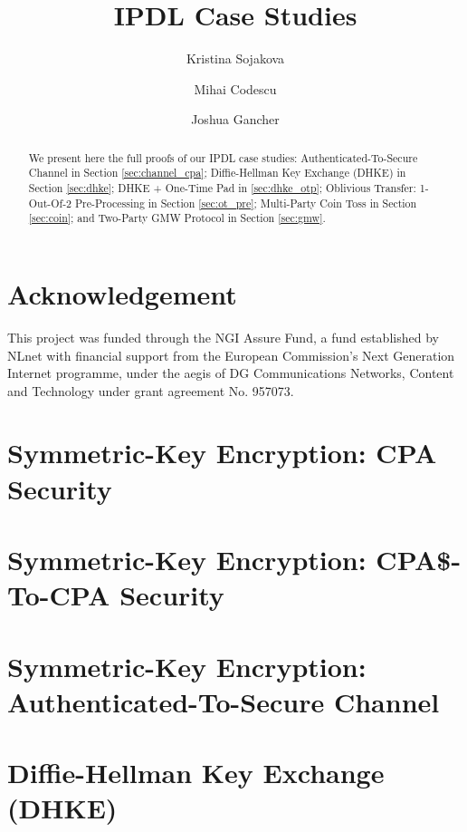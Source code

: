 \documentclass[11pt,hidelinks]{article}
\newcommand{\ipdl}{\textsf{IPDL} }
\begin{document}
\title{\ipdl Case Studies}
\author{Kristina Sojakova \and Mihai Codescu \and Joshua Gancher}

\maketitle

\begin{abstract}
We present here the full proofs of our \ipdl case studies: Authenticated-To-Secure Channel in Section \ref{sec:channel_cpa};
Diffie-Hellman Key Exchange (DHKE) in Section \ref{sec:dhke}; DHKE + One-Time Pad in \ref{sec:dhke_otp}; %
 Oblivious Transfer: 1-Out-Of-2 Pre-Processing in Section \ref{sec:ot_pre}; Multi-Party Coin Toss in Section \ref{sec:coin}; and Two-Party GMW Protocol in Section \ref{sec:gmw}.
\end{abstract}

\section*{\small Acknowledgement}
This project was funded through the NGI Assure Fund, a fund established by NLnet with financial support from the European Commission's Next Generation Internet programme, under the aegis of DG Communications Networks, Content and Technology under grant agreement No. 957073.

\section{Symmetric-Key Encryption: CPA Security}\label{sec:cpa}


\section{Symmetric-Key Encryption: CPA\$-To-CPA Security}\label{sec:pseudo_cpa}


\section{Symmetric-Key Encryption: Authenticated-To-Secure Channel}\label{sec:channel_cpa}


\section{Diffie-Hellman Key Exchange (DHKE)}\label{sec:dhke}

\end{document}
